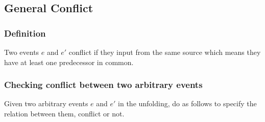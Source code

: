 \documentclass{llncs}
\begin{document}
\subsection{General Conflict}
\subsubsection{Definition}
Two events $e$ and $e'$ conflict if they input from the same source which means they have at least one predecessor in common.

\subsubsection{Checking conflict between two arbitrary events\\}
\noindent
Given two arbitrary events $e$ and $e'$ in the unfolding, do as follows to specify the relation between them, conflict or not.
\end{document}
